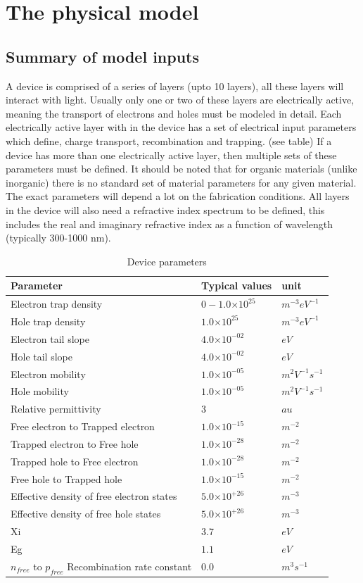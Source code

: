 \documentclass[11pt]{article}
\providecommand{\e}[1]{\ensuremath{\times 10^{#1}}}
\begin{document}
\vfill
\clearpage

\section{The physical model}
\subsection{Summary of model inputs}
A device is comprised of a series of layers (upto 10 layers), all these layers will interact with light.  Usually only one or two of these layers are electrically active, meaning the transport of electrons and holes must be modeled in detail.  Each electrically active layer with in the device has a set of electrical input parameters which define, charge transport, recombination and trapping. (see table)  If a device has more than one electrically active layer, then multiple sets of these parameters must be defined.  It should be noted that for organic materials (unlike inorganic) there is no standard set of material parameters for any given material.  The exact parameters will depend a lot on the fabrication conditions.  All layers in the device will also need a refractive index spectrum to be defined, this includes the real and imaginary refractive index as a function of wavelength (typically 300-1000 nm).
 
\begin{table}[H]
\begin{center}
\begin{tabular}{lll}
\hline
Parameter & Typical values & unit  \\
\hline
Electron trap density & $0-1.0\e{25}$ & $m^{-3} eV^{-1}$ \\
Hole trap density & $1.0\e{25}$ & $m^{-3} eV^{-1}$ \\
Electron tail slope & $4.0\e{-02}$ & $eV$ \\
Hole tail slope & $4.0\e{-02}$ & $eV$ \\
Electron mobility & $1.0\e{-05}$ & $m^{2}V^{-1}s^{-1}$ \\
Hole mobility & $1.0\e{-05}$ & $m^{2}V^{-1}s^{-1}$ \\
Relative permittivity & $3$ & $au$ \\
Free electron to Trapped electron & $1.0\e{-15}$ & $m^{-2}$ \\
Trapped electron to Free hole & $1.0\e{-28}$ & $m^{-2}$ \\
Trapped hole to Free electron & $1.0\e{-28}$ & $m^{-2}$ \\
Free hole to Trapped hole & $1.0\e{-15}$ & $m^{-2}$ \\
Effective density of free electron states & $5.0\e{+26}$ & $m^{-3}$ \\
Effective density of free hole states & $5.0\e{+26}$ & $m^{-3}$ \\
Xi & $3.7$ & $eV$ \\
Eg & $1.1$ & $eV$ \\
$n_{free}$ to $p_{free}$ Recombination rate constant & $0.0$ & $m^{3}s^{-1}$ \\
  \hline
\end{tabular}
\end{center}
\caption{Device parameters}
\end{table}
\end{document}
